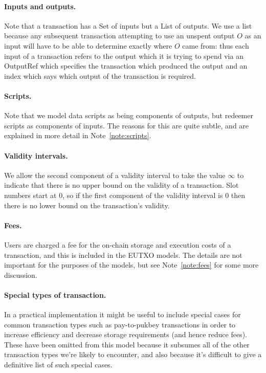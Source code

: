 \documentclass[a4paper]{article}
\newcommand{\todompj}[1]{\todo[inline,color=yellow!40,author=Michael]{#1}}
\newcounter{note}
\newcommand{\s}{\textsf}  %
\begin{document}
\paragraph{Inputs and outputs. } Note that a transaction has a
\textsf{Set} of inputs but a \textsf{List} of outputs. We use a list
because any subsequent transaction attempting to use an unspent output
$O$ as an input will have to be able to determine exactly where $O$
came from: thus each input of a transaction refers to the output which
it is trying to spend via an \s{OutputRef} which specifies the
transaction which produced the output and an index which says which
output of the transaction is required.


\paragraph{Scripts.} Note that we model data scripts as being
components of outputs, but redeemer scripts as components of inputs.
The reasons for this are quite subtle, and are explained in more
detail in Note~\ref{note:scripts}.

\paragraph{Validity intervals.} We allow the second component of a
validity interval to take the value $\infty$ to indicate that there is
no upper bound on the validity of a transaction.  Slot numbers start
at 0, so if the first component of the validity interval is 0
then there is no lower bound on the transaction's validity.

\paragraph{Fees.}  Users are charged a fee for the on-chain storage
and execution costs of a transaction, and this is included in the
EUTXO models.  The details are not important for the purposes of the
models, but see Note~\ref{note:fees} for some more discussion.

\paragraph{Special types of transaction.} In a practical
implementation it might be useful to include special cases for common
transaction types such as pay-to-pukbey transactions in order to
increase efficiency and decrease storage requirements (and hence
reduce fees).  These have been omitted from this model because it
subsumes all of the other transaction types we're likely to encounter,
and also because it's difficult to give a definitive list of such
special cases.
\end{document}
